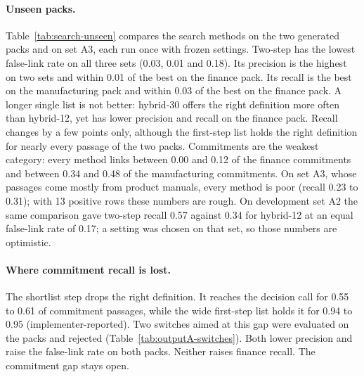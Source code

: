 \documentclass[11pt,a4paper]{article}
\begin{document}
\paragraph{Unseen packs.} Table~\ref{tab:search-unseen} compares the search methods on the two generated packs and on set A3, each run once with frozen settings. Two-step has the lowest false-link rate on all three sets (0.03, 0.01 and 0.18). Its precision is the highest on two sets and within 0.01 of the best on the finance pack. Its recall is the best on the manufacturing pack and within 0.03 of the best on the finance pack. A longer single list is not better: hybrid-30 offers the right definition more often than hybrid-12, yet has lower precision and recall on the finance pack. Recall changes by a few points only, although the first-step list holds the right definition for nearly every passage of the two packs. Commitments are the weakest category: every method links between 0.00 and 0.12 of the finance commitments and between 0.34 and 0.48 of the manufacturing commitments. On set A3, whose passages come mostly from product manuals, every method is poor (recall 0.23 to 0.31); with 13 positive rows these numbers are rough. On development set A2 the same comparison gave two-step recall 0.57 against 0.34 for hybrid-12 at an equal false-link rate of 0.17; a setting was chosen on that set, so those numbers are optimistic.



\paragraph{Where commitment recall is lost.} The shortlist step drops the right definition. It reaches the decision call for 0.55 to 0.61 of commitment passages, while the wide first-step list holds it for 0.94 to 0.95 (implementer-reported). %
Two switches aimed at this gap were evaluated on the packs and rejected (Table~\ref{tab:outputA-switches}). Both lower precision and raise the false-link rate on both packs. Neither raises finance recall. The commitment gap stays open. %
\end{document}

